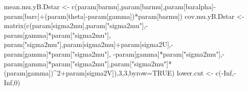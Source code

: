 \documentclass[
]{book}
\newenvironment{Shaded}{\begin{snugshade}}{\end{snugshade}}
\newcommand{\AttributeTok}[1]{\textcolor[rgb]{0.77,0.63,0.00}{#1}}
\newcommand{\ConstantTok}[1]{\textcolor[rgb]{0.00,0.00,0.00}{#1}}
\newcommand{\DecValTok}[1]{\textcolor[rgb]{0.00,0.00,0.81}{#1}}
\newcommand{\FunctionTok}[1]{\textcolor[rgb]{0.00,0.00,0.00}{#1}}
\newcommand{\NormalTok}[1]{#1}
\newcommand{\OtherTok}[1]{\textcolor[rgb]{0.56,0.35,0.01}{#1}}
\newcommand{\SpecialCharTok}[1]{\textcolor[rgb]{0.00,0.00,0.00}{#1}}
\newcommand{\StringTok}[1]{\textcolor[rgb]{0.31,0.60,0.02}{#1}}
\theoremstyle{definition}
\theoremstyle{definition}
\theoremstyle{definition}
\theoremstyle{definition}
\theoremstyle{remark}
\begin{document}
\begin{Shaded}
\begin{Highlighting}[]
\NormalTok{mean.mu.yB.Dstar }\OtherTok{\textless{}{-}} \FunctionTok{c}\NormalTok{(param[}\StringTok{\textquotesingle{}barmu\textquotesingle{}}\NormalTok{],param[}\StringTok{\textquotesingle{}barmu\textquotesingle{}}\NormalTok{],param[}\StringTok{\textquotesingle{}baralpha\textquotesingle{}}\NormalTok{]}\SpecialCharTok{{-}}\NormalTok{ param[}\StringTok{\textquotesingle{}barc\textquotesingle{}}\NormalTok{]}\SpecialCharTok{+}\NormalTok{(param[}\StringTok{\textquotesingle{}theta\textquotesingle{}}\NormalTok{]}\SpecialCharTok{{-}}\NormalTok{param[}\StringTok{\textquotesingle{}gamma\textquotesingle{}}\NormalTok{])}\SpecialCharTok{*}\NormalTok{param[}\StringTok{\textquotesingle{}barmu\textquotesingle{}}\NormalTok{])}
\NormalTok{cov.mu.yB.Dstar }\OtherTok{\textless{}{-}} \FunctionTok{matrix}\NormalTok{(}\FunctionTok{c}\NormalTok{(param[}\StringTok{\textquotesingle{}sigma2mu\textquotesingle{}}\NormalTok{],param[}\StringTok{"sigma2mu"}\NormalTok{],}\SpecialCharTok{{-}}\NormalTok{param[}\StringTok{\textquotesingle{}gamma\textquotesingle{}}\NormalTok{]}\SpecialCharTok{*}\NormalTok{param[}\StringTok{"sigma2mu"}\NormalTok{],}
\NormalTok{                            param[}\StringTok{"sigma2mu"}\NormalTok{],param[}\StringTok{\textquotesingle{}sigma2mu\textquotesingle{}}\NormalTok{]}\SpecialCharTok{+}\NormalTok{param[}\StringTok{\textquotesingle{}sigma2U\textquotesingle{}}\NormalTok{],}\SpecialCharTok{{-}}\NormalTok{param[}\StringTok{\textquotesingle{}gamma\textquotesingle{}}\NormalTok{]}\SpecialCharTok{*}\NormalTok{param[}\StringTok{"sigma2mu"}\NormalTok{],}
                            \SpecialCharTok{{-}}\NormalTok{param[}\StringTok{\textquotesingle{}gamma\textquotesingle{}}\NormalTok{]}\SpecialCharTok{*}\NormalTok{param[}\StringTok{"sigma2mu"}\NormalTok{],}\SpecialCharTok{{-}}\NormalTok{param[}\StringTok{\textquotesingle{}gamma\textquotesingle{}}\NormalTok{]}\SpecialCharTok{*}\NormalTok{param[}\StringTok{"sigma2mu"}\NormalTok{],param[}\StringTok{"sigma2mu"}\NormalTok{]}\SpecialCharTok{*}\NormalTok{(param[}\StringTok{\textquotesingle{}gamma\textquotesingle{}}\NormalTok{])}\SpecialCharTok{\^{}}\DecValTok{2}\SpecialCharTok{+}\NormalTok{param[}\StringTok{\textquotesingle{}sigma2V\textquotesingle{}}\NormalTok{]),}\DecValTok{3}\NormalTok{,}\DecValTok{3}\NormalTok{,}\AttributeTok{byrow=}\ConstantTok{TRUE}\NormalTok{)}
\NormalTok{lower.cut }\OtherTok{\textless{}{-}} \FunctionTok{c}\NormalTok{(}\SpecialCharTok{{-}}\ConstantTok{Inf}\NormalTok{,}\SpecialCharTok{{-}}\ConstantTok{Inf}\NormalTok{,}\DecValTok{0}\NormalTok{)}

\end{Highlighting}
\end{Shaded}
\end{document}

